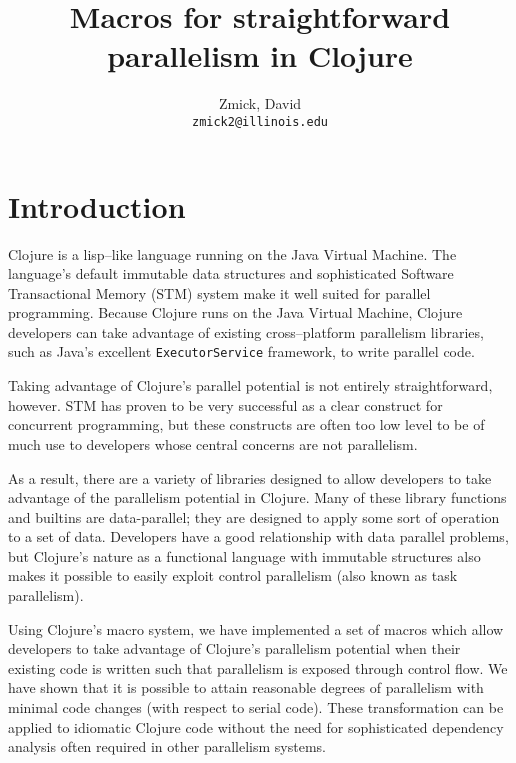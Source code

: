\documentclass{sig-alternate}
\author{
    Zmick, David\\
    \texttt{zmick2@illinois.edu}
}
\title{Macros for straightforward parallelism in Clojure}
\def\code#1{\mbox{\texttt{#1}}}
\begin{document}
\maketitle

\section{Introduction}
Clojure is a lisp--like language running on the Java Virtual Machine.
The language's default immutable data structures and sophisticated Software Transactional Memory (STM) system make it well suited for parallel programming.
Because Clojure runs on the Java Virtual Machine, Clojure developers can take advantage of existing cross--platform parallelism libraries, such as Java's excellent \code{ExecutorService} framework, to write parallel code.

Taking advantage of Clojure's parallel potential is not entirely straightforward, however.
STM has proven to be very successful as a clear construct for concurrent programming\cite{Jones2007a}, but these constructs are often too low level to be of much use to developers whose central concerns are not parallelism\cite{Boehm2009}.

As a result, there are a variety of libraries designed to allow developers to take advantage of the parallelism potential in Clojure.\footnotemark{}\footnotemark{}\footnotemark{}\footnotemark{}\footnotemark{}
Many of these library functions and builtins are data-parallel; they are designed to apply some sort of operation to a set of data.
Developers have a good relationship with data parallel problems\cite{Okur2012a}, but Clojure's nature as a functional language with immutable structures also makes it possible to easily exploit control parallelism (also known as task parallelism\cite{Andradea, Rodr}).


Using Clojure's macro system, we have implemented a set of macros which allow developers to take advantage of Clojure's parallelism potential when their existing code is written such that parallelism is exposed through control flow.
We have shown that it is possible to attain reasonable degrees of parallelism with minimal code changes (with respect to serial code).
These transformation can be applied to idiomatic Clojure code without the need for sophisticated dependency analysis often required in other parallelism systems.
\end{document}
